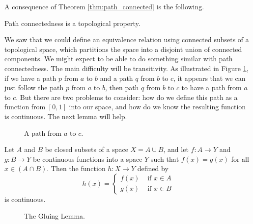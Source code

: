 A consequence of Theorem \ref{thm:path_connected} is the following.

\begin{corollary} Path connectedness is a topological property.
\end{corollary}



We saw that we could define an equivalence relation using connected subsets of a topological space, which partitions the space into a disjoint union of connected components. We might expect to be able to do something similar with path connectedness. The main difficulty will be transitivity. As illustrated in Figure \ref{F:path_transitive}, if we have a path $p$ from $a$ to $b$ and a path $q$ from $b$ to $c$, it appears that we can just follow the path $p$ from $a$ to $b$, then path $q$ from $b$ to $c$ to have a path from $a$ to $c$. But there are two problems to consider: how do we define this path as a function from $[0,1]$ into our space, and how do we know the resulting function is continuous. The next lemma will help.
\begin{figure}[h]
\begin{center}
\end{center}
\caption{A path from $a$ to $c$.}
\label{F:path_transitive}
\end{figure}

\begin{lemma}  Let $A$ and $B$ be closed subsets of a space $X = A \cup B$, and let $f:A \to Y$ and $g: B \to Y$ be continuous functions into a space $Y$ such that $f(x)=g(x)$ for all $x \in (A \cap B)$. Then the function $h:X \to Y$ defined by 
\[h(x) = \begin{cases} f(x) &\text{ if } x \in A \\ g(x) &\text{ if } x \in B \end{cases}\]
is continuous. 
\end{lemma}

\begin{figure}[h]
\begin{center}
\end{center}
\caption{The Gluing Lemma.}
\label{F:Gluing_Lemma}
\end{figure}

